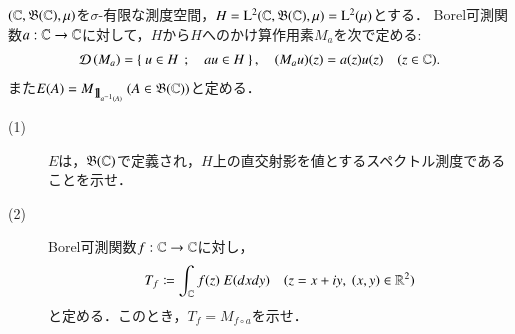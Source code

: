 	\begin{screen}
		\begin{e.g.}
			$(\mathbb{C},\mathfrak{B}(\mathbb{C}),\mu)$を$\sigma$-有限な測度空間，$H = \mathrm{L}^2(\mathbb{C},\mathfrak{B}(\mathbb{C}),\mu) = \mathrm{L}^2(\mu)$とする．
			Borel可測関数$a:\mathbb{C} \rightarrow \mathbb{C}$に対して，$H$から$H$へのかけ算作用素$M_a$を次で定める:
			\begin{align}
				\Dom{M_a} = \Set{u \in H}{au \in H},
				\quad (M_a u)(z) = a(z) u(z) \quad (z \in \C).
			\end{align}
			また$E(A) = M_{\mbox{1}\hspace{-0.25em}\mbox{l}_{a^{-1}(A)}}\ (A \in \mathfrak{B}(\mathbb{C}))$と定める．
			\begin{description}
				\item[(1)] $E$は，$\mathfrak{B}(\mathbb{C})$で定義され，$H$上の直交射影を値とするスペクトル測度であることを示せ．
				\item[(2)] Borel可測関数$f:\mathbb{C} \rightarrow \mathbb{C}$に対し，
					\begin{align}
						T_f \coloneqq \int_{\mathbb{C}} f(z)\ E(dxdy) \quad (z = x + iy,\ (x,y) \in \mathbb{R}^2)
					\end{align}
					と定める．このとき，$T_f = M_{f \circ a}$を示せ．
			\end{description}
		\end{e.g.}
	\end{screen}
	
	